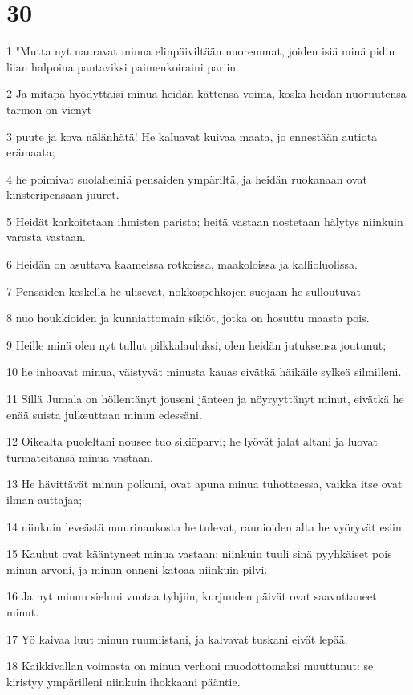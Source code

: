 \chapter{30}

\par 1 "Mutta nyt nauravat minua elinpäiviltään nuoremmat, joiden isiä minä pidin liian halpoina pantaviksi paimenkoiraini pariin.
\par 2 Ja mitäpä hyödyttäisi minua heidän kättensä voima, koska heidän nuoruutensa tarmon on vienyt
\par 3 puute ja kova nälänhätä! He kaluavat kuivaa maata, jo ennestään autiota erämaata;
\par 4 he poimivat suolaheiniä pensaiden ympäriltä, ja heidän ruokanaan ovat kinsteripensaan juuret.
\par 5 Heidät karkoitetaan ihmisten parista; heitä vastaan nostetaan hälytys niinkuin varasta vastaan.
\par 6 Heidän on asuttava kaameissa rotkoissa, maakoloissa ja kallioluolissa.
\par 7 Pensaiden keskellä he ulisevat, nokkospehkojen suojaan he sulloutuvat -
\par 8 nuo houkkioiden ja kunniattomain sikiöt, jotka on hosuttu maasta pois.
\par 9 Heille minä olen nyt tullut pilkkalauluksi, olen heidän jutuksensa joutunut;
\par 10 he inhoavat minua, väistyvät minusta kauas eivätkä häikäile sylkeä silmilleni.
\par 11 Sillä Jumala on höllentänyt jouseni jänteen ja nöyryyttänyt minut, eivätkä he enää suista julkeuttaan minun edessäni.
\par 12 Oikealta puoleltani nousee tuo sikiöparvi; he lyövät jalat altani ja luovat turmateitänsä minua vastaan.
\par 13 He hävittävät minun polkuni, ovat apuna minua tuhottaessa, vaikka itse ovat ilman auttajaa;
\par 14 niinkuin leveästä muurinaukosta he tulevat, raunioiden alta he vyöryvät esiin.
\par 15 Kauhut ovat kääntyneet minua vastaan; niinkuin tuuli sinä pyyhkäiset pois minun arvoni, ja minun onneni katoaa niinkuin pilvi.
\par 16 Ja nyt minun sieluni vuotaa tyhjiin, kurjuuden päivät ovat saavuttaneet minut.
\par 17 Yö kaivaa luut minun ruumiistani, ja kalvavat tuskani eivät lepää.
\par 18 Kaikkivallan voimasta on minun verhoni muodottomaksi muuttunut: se kiristyy ympärilleni niinkuin ihokkaani pääntie.
